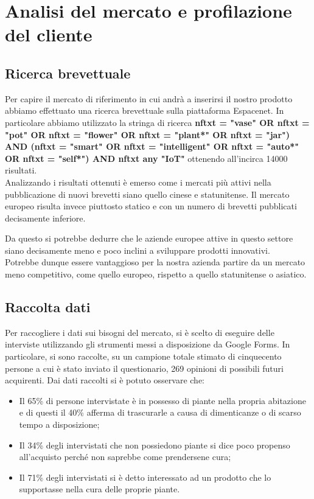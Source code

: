 \newpage
\section{Analisi del mercato e profilazione del cliente}

\subsection{Ricerca brevettuale}

Per capire il mercato di riferimento in cui andrà a inserirsi il nostro prodotto abbiamo effettuato una ricerca brevettuale sulla piattaforma Espacenet. In particolare abbiamo utilizzato la stringa di ricerca \textbf{nftxt = "vase" OR nftxt = "pot" OR nftxt = "flower" OR nftxt = "plant*" OR nftxt = "jar") AND (nftxt = "smart" OR nftxt = "intelligent" OR nftxt = "auto*" OR nftxt = "self*") AND nftxt any "IoT"} ottenendo all'incirca 14000 risultati.\\Analizzando i risultati ottenuti è emerso come i mercati più attivi nella pubblicazione di nuovi brevetti siano quello cinese e statunitense. Il mercato europeo risulta invece piuttosto statico e con un numero di brevetti pubblicati decisamente inferiore.

Da questo si potrebbe dedurre che le aziende europee attive in questo settore siano decisamente meno e poco inclini a sviluppare prodotti innovativi.\\Potrebbe dunque essere vantaggioso per la nostra azienda partire da un mercato meno competitivo, come quello europeo, rispetto a quello statunitense o asiatico. 

\subsection{Raccolta dati}

Per raccogliere i dati sui bisogni del mercato, si è scelto di eseguire delle interviste utilizzando gli strumenti messi a disposizione da Google Forms. In particolare, si sono raccolte, su un campione totale stimato di cinquecento persone a cui è stato inviato il questionario, 269 opinioni di possibili futuri acquirenti.
Dai dati raccolti si è potuto osservare che:

\begin{itemize}
	\item Il 65\% di persone intervistate è in possesso di piante nella propria abitazione e di questi il 40\% afferma di trascurarle a causa di dimenticanze o di scarso tempo a disposizione;
	
	\item Il 34\% degli intervistati che non possiedono piante si dice poco propenso all’acquisto perché non saprebbe come prendersene cura;
	
	\item Il 71\% degli intervistati si è detto interessato ad un prodotto che lo supportasse nella cura delle proprie piante.
\end{itemize}

